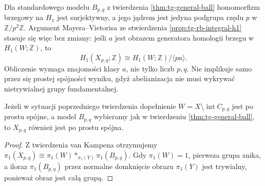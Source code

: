 \begin{uwaga}
Dla standardowego modelu $B_{p,q}$ z twierdzenia
\ref{thm:tg-general-ball} homomorfizm brzegowy
na $H_1$ jest surjektywny, a jego jądrem jest
jedyna podgrupa rzędu $p$ w $\mathbb Z/p^2\mathbb Z$.
Argument Mayera--Vietorisa ze stwierdzenia
\ref{prop:tg-rb-integral-h1} stosuje się więc
bez zmiany: jeśli $a$ jest obrazem generatora
homologii brzegu w $H_1(W;\mathbb Z)$, to
\[
H_1(X_{p,q};\mathbb Z)\cong H_1(W;\mathbb Z)/\langle pa\rangle.
\]
Obliczenie wymaga znajomości klasy $a$, nie tylko
liczb $p,q$. Nie implikuje samo przez się prostej
spójności wyniku, gdyż abelianizacja nie musi
wykrywać nietrywialnej grupy fundamentalnej.
\end{uwaga}

\begin{wniosek}
Jeżeli w sytuacji poprzedniego twierdzenia dopełnienie
$W=X\setminus\operatorname{int}C_{p,q}$ jest po prostu spójne,
a model $B_{p,q}$ wybieramy jak w twierdzeniu
\ref{thm:tg-general-ball}, to $X_{p,q}$ również jest po prostu
spójna.
\end{wniosek}

\begin{proof}
Z twierdzenia van Kampena otrzymujemy
$\pi_1(X_{p,q})\cong\pi_1(W)*_{\pi_1(Y)}\pi_1(B_{p,q})$.
Gdy $\pi_1(W)=1$, pierwsza grupa znika, a iloraz
$\pi_1(B_{p,q})$ przez normalne domknięcie obrazu
$\pi_1(Y)$ jest trywialny, ponieważ obraz jest całą grupą.
\end{proof}

